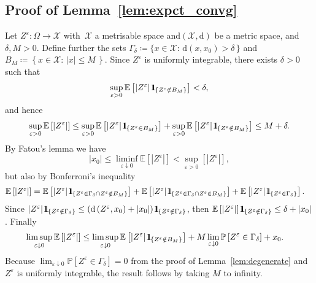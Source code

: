 \documentclass{amsart}[11pt]
\numberwithin{equation}{section}
\numberwithin{theorem}{subsection}
\numberwithin{proposition}{subsection}
\numberwithin{definition}{subsection}
\numberwithin{lemma}{subsection}
\numberwithin{assumption}{subsection}
\newcommand{\Xx}{\mathcal{X}}
\newcommand{\PP}{\mathbb{P}}
\newcommand{\EE}{\mathbb{E}}
\newcommand{\eps}{\varepsilon}
\newcommand{\ind}{1\hspace{-2.1mm}{1}} %
\begin{document}
\subsection{Proof of Lemma~\ref{lem:expct_convg}}\label{sec:lem:expct_convg_Proof}
Let $Z^\eps:\Omega\rightarrow \Xx$ 
with~$\Xx$ a metrisable space and$(\Xx, \mathrm{d})$ be a metric space, and $\delta,M>0$. 
Define further the sets ${\Gamma_{\delta} \coloneqq \{x \in \Xx: \, \mathrm{d}(x,x_0)>\delta \, \}}$ and ${B_M \coloneqq \left \{ x\in\Xx: \, |x| \leq M \, \right \}}$. 
Since $Z^\eps$ is uniformly integrable, there exists $\delta>0$ such that
\[
\sup_{\eps>0}\EE\left[ \left\vert Z^\eps \right\vert \ind_{\left\{ Z^\eps \notin B_M \right\}} \right] < \delta,
\]
and hence 
$$
\sup_{\eps>0}\EE\left[ \left\vert Z^\eps \right\vert \right] \leq \sup_{\eps>0}\EE\left[ \left\vert Z^\eps \right\vert \ind_{\left\{ Z^\eps \in B_M \right\}} \right] + \sup_{\eps>0}\EE\left[ \left\vert Z^\eps \right\vert \ind_{\left\{ Z^\eps \notin B_M \right\}} \right]
\leq M + \delta.
$$
By Fatou's lemma we have
\[
|x_0| \leq \liminf_{\eps\downarrow 0} \EE\left[ \left\vert Z^\eps \right\vert \right] < \sup_{\eps>0} \left[ \left\vert Z^\eps \right\vert \right],
\]
but also by Bonferroni's inequality
\begin{align*}
\EE\left[ \left\vert Z^\eps \right\vert \right] &= \EE\left[ \left\vert Z^\eps \right\vert \ind_{\left \{ Z^\eps \in \Gamma_\delta \cap Z^\eps \notin B_M \right \}} \right] + \EE\left[ \left\vert Z^\eps \right\vert \ind_{\left \{ Z^\eps \in \Gamma_\delta \cap Z^\eps \in B_M \right \}} \right] + \EE\left[ \left\vert Z^\eps \right\vert \ind_{\left \{ Z^\eps \in \Gamma_\delta \right \}} \right].
\end{align*}
Since $ \left\vert Z^\eps \right\vert \ind_{\left \{ Z^\eps \notin \Gamma_\delta \right \}}\leq \left ( \mathrm{d}\left(Z^\eps, x_0\right) + |x_0| \right ) \ind_{\left \{ Z^\eps \notin \Gamma_\delta \right \}}$, then $\EE\left[ \left\vert Z^\eps \right\vert \right]\ind_{\left \{ Z^\eps \notin \Gamma_\delta \right \}} \leq \delta + |x_0|$. Finally
\begin{align*}
\limsup_{\eps\downarrow 0} \EE\left[ \left\vert Z^\eps \right\vert \right]  &\leq \limsup_{\eps\downarrow 0}\EE\left[ \left\vert Z^\eps \right\vert \ind_{\left \{Z^\eps \notin B_M \right \}} \right] + M\lim_{\eps\downarrow 0} \PP\left[ Z^\eps \in \Gamma_\delta \right ] + x_0.
\end{align*}
Because $\lim_{\eps\downarrow 0} \PP\left[ Z^\eps \in \Gamma_\delta \right ] = 0 $ from the proof of Lemma~\ref{lem:degenerate} and $Z^\eps$ is uniformly integrable, the result follows by taking $M$ to infinity.
\end{document}
